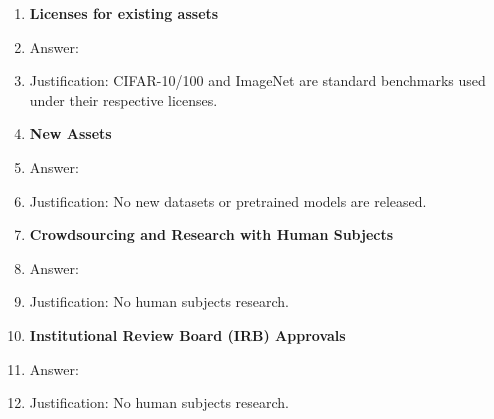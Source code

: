 \documentclass{article}
\begin{document}
\begin{enumerate}
\item {\bf Licenses for existing assets}
    \item[] Answer: \answerYes{}
    \item[] Justification: CIFAR-10/100 and ImageNet are standard benchmarks used under their respective licenses.

\item {\bf New Assets}
    \item[] Answer: \answerNA{}
    \item[] Justification: No new datasets or pretrained models are released.

\item {\bf Crowdsourcing and Research with Human Subjects}
    \item[] Answer: \answerNA{}
    \item[] Justification: No human subjects research.

\item {\bf Institutional Review Board (IRB) Approvals}
    \item[] Answer: \answerNA{}
    \item[] Justification: No human subjects research.

\end{enumerate}
\end{document}
